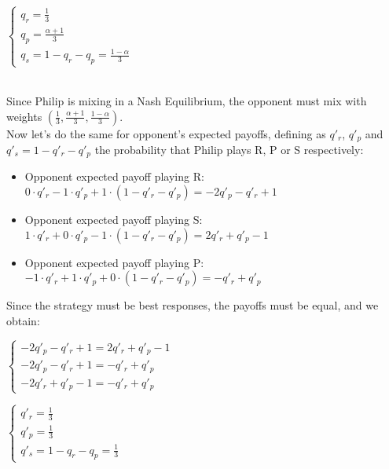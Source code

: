 \documentclass[11pt]{article}
\begin{document}
\begin{minipage}[t]{0.3\textwidth}
	\(\left \{ \begin{array}{l}
		q_r = \frac{1}{3} \\
		q_p = \frac{\alpha + 1}{3} \\
		q_s = 1 - q_r - q_p = \frac{1 - \alpha}{3}
	\end{array}
	\right. \)
\end{minipage} \\
Since Philip is mixing in a Nash Equilibrium, the opponent must mix with weights \(\left(\frac{1}{3},\frac{\alpha + 1}{3},\frac{1 - \alpha}{3}\right) \).\\
Now let's do the same for opponent's expected payoffs, defining as $q'_r$, $q'_p$ and $q'_s = 1 - q'_r - q'_p$ the probability that Philip plays R, P or S respectively:
\begin{itemize}
	\item Opponent expected payoff playing R: $0 \cdot q'_r - 1 \cdot q'_p + 1 \cdot (1 - q'_r - q'_p) = -2q'_p - q'_r + 1$
	\item Opponent expected payoff playing S: $1 \cdot q'_r + 0 \cdot q'_p - 1 \cdot (1 - q'_r - q'_p) = 2q'_r + q'_p - 1$
	\item Opponent expected payoff playing P: $-1 \cdot q'_r + 1 \cdot q'_p + 0 \cdot (1 - q'_r - q'_p) = -q'_r + q'_p$
\end{itemize}
Since the strategy must be best responses, the payoffs must be equal, and we obtain: \\
\begin{minipage}[t]{0.4\textwidth}
	\(\left \{ \begin{array}{l}
	-2q'_p - q'_r + 1 = 2q'_r + q'_p - 1 \\
	-2q'_p - q'_r + 1 = -q'_r + q'_p \\
	-2q'_r + q'_p - 1 = -q'_r + q'_p
	\end{array}
	\right. \)
\end{minipage}
\begin{minipage}[t]{0.07\textwidth}
\raisebox{-.5\height}{\scalebox{2}{$\Rightarrow$}}
\end{minipage}
\begin{minipage}[t]{0.3\textwidth}
\(\left \{ \begin{array}{l}
q'_r = \frac{1}{3} \\
q'_p = \frac{1}{3} \\
q'_s = 1 - q_r - q_p = \frac{1}{3}
\end{array}
\right. \)
\end{minipage} \\
\end{document}

